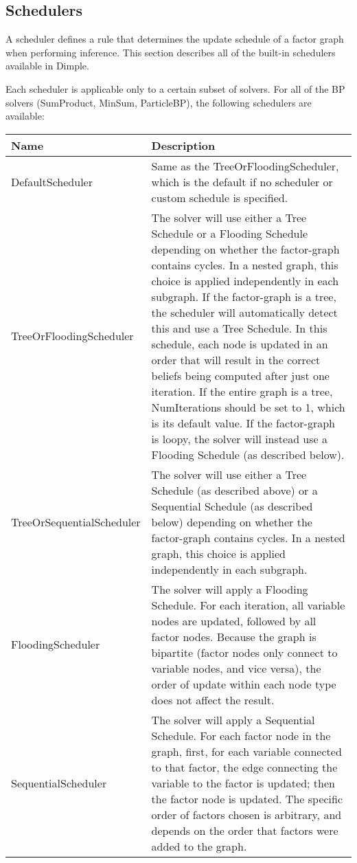 \subsection{Schedulers}
\label{sec:Schedulers}

A scheduler defines a rule that determines the update schedule of a factor graph when performing inference.  This section describes all of the built-in schedulers available in Dimple.

Each scheduler is applicable only to a certain subset of solvers.  For all of the BP solvers (SumProduct, MinSum, ParticleBP), the following schedulers are available:

\begin{longtable}{l p{4in}}
\textbf{Name} & \textbf{Description} \\ \hline \hline
%
\textsf{DefaultScheduler} & Same as the TreeOrFloodingScheduler, which is the default if no scheduler or custom schedule is specified. \\ \hline
%
\textsf{TreeOrFloodingScheduler} & The solver will use either a Tree Schedule or a Flooding Schedule depending on whether the factor-graph contains cycles.  In a nested graph, this choice is applied independently in each subgraph.  If the factor-graph is a tree, the scheduler will automatically detect this and use a Tree Schedule.  In this schedule, each node is updated in an order that will result in the correct beliefs being computed after just one iteration.  If the entire graph is a tree, NumIterations should be set to 1, which is its default value.  If the factor-graph is loopy, the solver will instead use a Flooding Schedule (as described below). \\ \hline
%
\textsf{TreeOrSequentialScheduler} & The solver will use either a Tree Schedule (as described above) or a Sequential Schedule (as described below) depending on whether the factor-graph contains cycles.  In a nested graph, this choice is applied independently in each subgraph.  \\ \hline
%
\textsf{FloodingScheduler} & The solver will apply a Flooding Schedule.  For each iteration, all variable nodes are updated, followed by all factor nodes.  Because the graph is bipartite (factor nodes only connect to variable nodes, and vice versa), the order of update within each node type does not affect the result. \\ \hline
%
\textsf{SequentialScheduler} & The solver will apply a Sequential Schedule.  For each factor node in the graph, first, for each variable connected to that factor, the edge connecting the variable to the factor is updated; then the factor node is updated.  The specific order of factors chosen is arbitrary, and depends on the order that factors were added to the graph. \\ \hline

\end{longtable}
